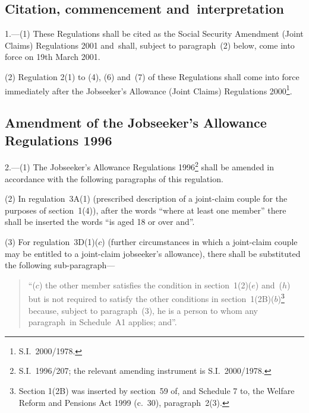 \documentclass[12pt,a4paper]{article}
\begin{document}
{\sloppy

\tableofcontents

}

\bigskip

\setcounter{secnumdepth}{-2}

\subsection[1. Citation, commencement and~interpretation]{Citation, commencement and~interpretation}

1.---(1)  These Regulations shall be cited as the Social Security Amendment (Joint Claims) Regulations 2001 and~shall, subject to paragraph~(2) below, come into force on 19th March 2001.

(2) Regulation 2(1) to (4), (6) and~(7) of these Regulations shall come into force immediately after the Jobseeker’s Allowance (Joint Claims) Regulations 2000\footnote{S.I.~2000/1978.}.

\subsection[2, Amendment of the Jobseeker’s Allowance Regulations 1996]{Amendment of the Jobseeker’s Allowance Regulations 1996}

2.---(1)  The Jobseeker’s Allowance Regulations 1996\footnote{S.I.~1996/207; the relevant amending instrument is S.I.~2000/1978.} shall be amended in accordance with the following paragraphs of this regulation.

(2) In regulation~3A(1) (prescribed description of a joint-claim couple for the purposes of section~1(4)), after the words “where at least one member” there shall be inserted the words “is aged 18 or over and”.

(3) For regulation~3D(1)($c$)  (further circumstances in which a joint-claim couple may be entitled to a joint-claim jobseeker’s allowance), there shall be substituted the following sub-paragraph—
\begin{quotation}
“($c$) the other member satisfies the condition in section~1(2)($e$)  and~($h$)  but is not required to satisfy the other conditions in section~1(2B)($b$)\footnote{Section 1(2B) was inserted by section~59 of, and Schedule 7 to, the Welfare Reform and Pensions Act 1999 (c.~30), paragraph~2(3).} because, subject to paragraph~(3), he is a person to whom any paragraph~in Schedule~A1 applies; and”.
\end{quotation}
\end{document}
